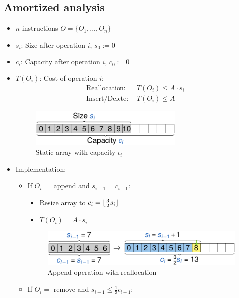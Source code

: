 \documentclass[12pt, a4paper]{scrartcl}
\newcommand{\imgwidth}{.7\textwidth}
\DeclarePairedDelimiter{\floor}{\lfloor}{\rfloor}
\begin{document}
\subsection{Amortized analysis}
\label{sec:amortized_analysis}
\begin{itemize}
\item $n$ instructions $O=\{O_1,...,O_n\}$
\item $s_i$: Size after operation $i$, $s_0:=0$
\item $c_i$: Capacity after operation $i$, $c_0:=0$
\item $T(O_i)$: Cost of operation $i$:
  \begin{align*}
    \mathrm{Reallocation{:}\ }&T(O_i)\le A\cdot s_i\\
    \mathrm{Insert/Delete{:}\ }&T(O_i)\le A
  \end{align*}
  \begin{figure}[htbp]
    \centering
    \includegraphics[width=0.7\textwidth]{static_array_capacity}
    \caption{Static array with capacity $c_i$}
    \label{fig:static_array_capacity}
  \end{figure}
\item Implementation:
  \begin{itemize}
  \item If $O_i=$ append and $s_{i-1}=c_{i-1}$:
    \begin{itemize}
    \item Resize array to $c_i=\floor{\frac{3}{2}s_i}$
    \item $T(O_i)=A\cdot s_i$
    \end{itemize}
    \begin{figure}[htbp]
      \centering
      \includegraphics[width=\imgwidth]{array_append}
      \caption{Append operation with reallocation}
      \label{fig:append_array}
    \end{figure}
  \item If $O_i=$ remove and $s_{i-1}\le\frac{1}{3}c_{i-1}$:
    \begin{itemize}

\end{itemize}
\end{itemize}
\end{itemize}
\end{document}
